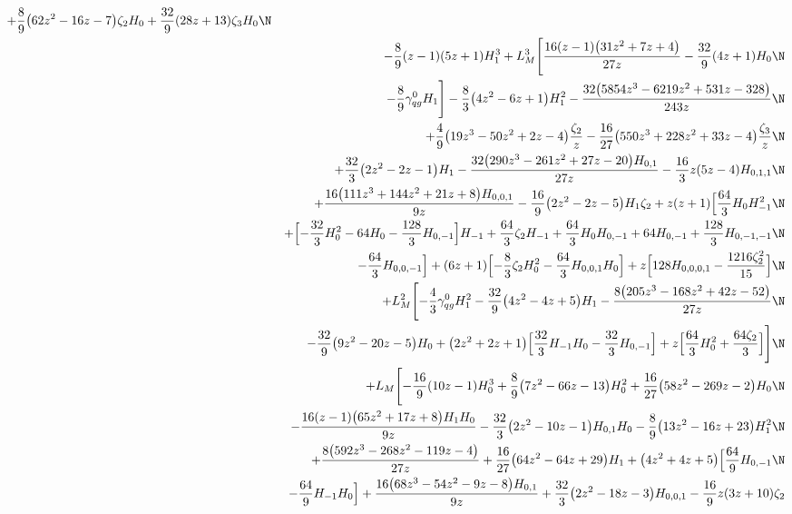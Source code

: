 \begin{eqnarray}
+\frac{8}{9} \big(62 z^2-16 z-7\big) \zeta_2 H_0
+\frac{32}{9} (28 z+13) \zeta_3 H_0
\N\\&&
-\frac{8}{9} (z-1) (5 z+1) H_1^3
+ L_M^3 \Biggl[
\frac{16 (z-1) \big(31 z^2+7 z+4\big)}{27 z}
-\frac{32}{9} (4 z+1) H_0
\N\\&&
-\frac{8}{9} {\gamma}_{qg}^{0} H_1\Biggr]
-\frac{8}{3} \big(4 z^2-6 z+1\big) H_1^2
-\frac{32 \big(5854 z^3-6219 z^2+531 z-328\big)}{243 z}
\N\\&&
+\frac{4}{9} \big(19 z^3-50 z^2+2 z-4\big) \frac{\zeta_2}{z}
-\frac{16}{27} \big(550 z^3+228 z^2+33 z-4\big) \frac{\zeta_3}{z}
\N\\&&
+\frac{32}{3} \big(2 z^2-2 z-1\big) H_1
-\frac{32 \big(290 z^3-261 z^2+27 z-20\big) H_{0,1}}{27 z}
-\frac{16}{3} z (5 z-4) H_{0,1,1}
\N\\&&
+\frac{16 \big(111 z^3+144 z^2+21 z+8\big) H_{0,0,1}}{9 z}
-\frac{16}{9} \big(2 z^2-2 z-5\big) H_1 \zeta_2+z (z+1) \Bigl[
\frac{64}{3} H_0 H_{-1}^2
\N\\&&
+\Bigl[
-\frac{32}{3} H_0^2-64 H_0
-\frac{128}{3} H_{0,-1}\Bigr] H_{-1}
+\frac{64}{3} \zeta_2 H_{-1}
+\frac{64}{3} H_0 H_{0,-1}+64 H_{0,-1}
+\frac{128}{3} H_{0,-1,-1}
\N\\&&
-\frac{64}{3} H_{0,0,-1}\Bigr]+(6 z+1) \Bigl[
-\frac{8}{3} \zeta_2 H_0^2
-\frac{64}{3} H_{0,0,1} H_0\Bigr]+z \Bigl[128 H_{0,0,0,1}
-\frac{1216 \zeta_2^2}{15}\Bigr]
\N\\&&
+L_M^2 \Biggl[
-\frac{4}{3} {\gamma}_{qg}^{0} H_1^2
-\frac{32}{9} \big(4 z^2-4 z+5\big) H_1
-\frac{8 \big(205 z^3-168 z^2+42 z-52\big)}{27 z}
\N\\&&
-\frac{32}{9} \big(9 z^2-20 z-5\big) H_0+\big(2 z^2+2 z+1\big) \Bigl[
\frac{32}{3} H_{-1} H_0
-\frac{32}{3} H_{0,-1}\Bigr]+z \Bigl[
\frac{64}{3} H_0^2
+\frac{64 \zeta_2}{3}\Bigr]\Biggr]
\N\\&&
+L_M \Biggl[
-\frac{16}{9} (10 z-1) H_0^3
+\frac{8}{9} \big(7 z^2-66 z-13\big) H_0^2
+\frac{16}{27} \big(58 z^2-269 z-2\big) H_0
\N\\&&
-\frac{16 (z-1) \big(65 z^2+17 z+8\big) H_1 H_0}{9 z}
-\frac{32}{3} \big(2 z^2-10 z-1\big) H_{0,1} H_0
-\frac{8}{9} \big(13 z^2-16 z+23\big) H_1^2
\N\\&&
+\frac{8 \big(592 z^3-268 z^2-119 z-4\big)}{27 z}
+\frac{16}{27} \big(64 z^2-64 z+29\big) H_1
+\big(4 z^2+4 z+5\big) \Bigl[
\frac{64}{9} H_{0,-1}
\N\\&&
-\frac{64}{9} H_{-1} H_0\Bigr]
+\frac{16 \big(68 z^3-54 z^2-9 z-8\big) H_{0,1}}{9 z}
+\frac{32}{3} \big(2 z^2-18 z-3\big) H_{0,0,1}
-\frac{16}{9} z (3 z+10) \zeta_2

\end{eqnarray}
